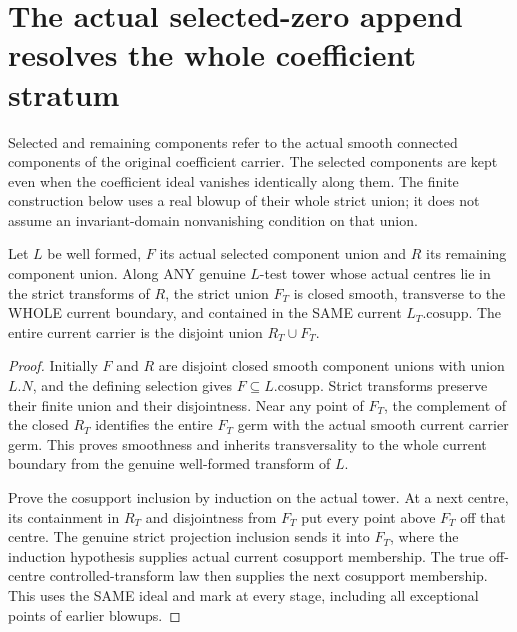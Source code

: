 \section{The actual selected-zero append resolves the whole coefficient stratum}
\label{sec:nc-coefficient-stratum-resolution}

Selected and remaining components refer to the actual smooth connected
components of the original coefficient carrier. The selected components are
kept even when the coefficient ideal vanishes identically along them. The
finite construction below uses a real blowup of their whole strict union;
it does not assume an invariant-domain nonvanishing condition on that union.

\begin{theorem}
\label{hir:nc-coefficient-selected-strict-geometry}
\leanok
Let $L$ be well formed, $F$ its actual selected component union and $R$ its
remaining component union. Along ANY genuine $L$-test tower whose actual
centres lie in the strict transforms of $R$, the strict union $F_T$ is closed
smooth, transverse to the WHOLE current boundary, and contained in the SAME
current $L_T.\mathrm{cosupp}$. The entire current carrier is the disjoint
union $R_T\cup F_T$.
\end{theorem}
\begin{proof}
Initially $F$ and $R$ are disjoint closed smooth component unions with union
$L.N$, and the defining selection gives $F\subseteq L.\mathrm{cosupp}$.
Strict transforms preserve their finite union and their disjointness. Near
any point of $F_T$, the complement of the closed $R_T$ identifies the entire
$F_T$ germ with the actual smooth current carrier germ. This proves smoothness
and inherits transversality to the whole current boundary from the genuine
well-formed transform of $L$.

Prove the cosupport inclusion by induction on the actual tower. At a next
centre, its containment in $R_T$ and disjointness from $F_T$ put every point
above $F_T$ off that centre. The genuine strict projection inclusion sends
it into $F_T$, where the induction hypothesis supplies actual current
cosupport membership. The true off-centre controlled-transform law then
supplies the next cosupport membership. This uses the SAME ideal and mark at
every stage, including all exceptional points of earlier blowups.
\end{proof}

